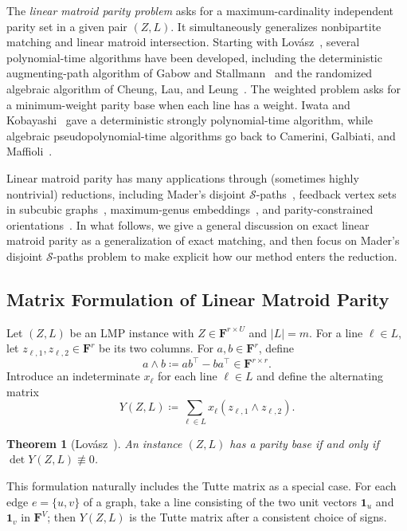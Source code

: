 \documentclass[11pt, a4paper]{article}
\theoremstyle{plain}
\newtheorem{theorem}{Theorem}[section]
\theoremstyle{definition}
\theoremstyle{remark}
\newcommand{\cS}{\mathcal{S}}
\newcommand{\bF}{\mathbf{F}}
\begin{document}
The \emph{linear matroid parity problem} asks for a maximum-cardinality independent parity set in a given pair $(Z,L)$.
It simultaneously generalizes nonbipartite matching and linear matroid intersection.
Starting with Lov\'{a}sz~\cite{Lovasz1981}, several polynomial-time algorithms have been developed, including the deterministic augmenting-path algorithm of Gabow and Stallmann~\cite{GS1986} and the randomized algebraic algorithm of Cheung, Lau, and Leung~\cite{CLL2014}.
The weighted problem asks for a minimum-weight parity base when each line has a weight.
Iwata and Kobayashi~\cite{IK2022} gave a deterministic strongly polynomial-time algorithm, while algebraic pseudopolynomial-time algorithms go back to Camerini, Galbiati, and Maffioli~\cite{CGM1992}.

Linear matroid parity has many applications through (sometimes highly nontrivial) reductions, including Mader's disjoint $\cS$-paths~\cite{Lovasz1980,Schrijver2003}, feedback vertex sets in subcubic graphs~\cite{UKG1988}, maximum-genus embeddings~\cite{FGM1988}, and parity-constrained orientations~\cite{FJS2001}.
In what follows, we give a general discussion on exact linear matroid parity as a generalization of exact matching, and then focus on Mader's disjoint $\cS$-paths problem to make explicit how our method enters the reduction.



\subsection{Matrix Formulation of Linear Matroid Parity}\label{sec:matrix_LMP}
Let $(Z,L)$ be an LMP instance with $Z\in\bF^{r\times U}$ and $|L|=m$.
For a line $\ell\in L$, let $z_{\ell,1},z_{\ell,2}\in\bF^r$ be its two columns.
For $a,b\in\bF^r$, define
\[a\wedge b\coloneqq ab^\top-ba^\top\in\bF^{r\times r}.\]
Introduce an indeterminate $x_\ell$ for each line $\ell \in L$ and define the alternating matrix
\[Y(Z,L)\coloneqq\sum_{\ell\in L}x_\ell(z_{\ell,1}\wedge z_{\ell,2}).\]

\begin{theorem}[Lov\'{a}sz~\cite{Lovasz1979}]\label{thm:lovasz-lmp}
An instance $(Z,L)$ has a parity base if and only if $\det Y(Z,L)\not\equiv0$.
\end{theorem}

This formulation naturally includes the Tutte matrix as a special case.
For each edge $e=\{u,v\}$ of a graph, take a line consisting of the two unit vectors $\mathbf{1}_u$ and $\mathbf{1}_v$ in $\bF^V$; then $Y(Z,L)$ is the Tutte matrix after a consistent choice of signs.
\end{document}
